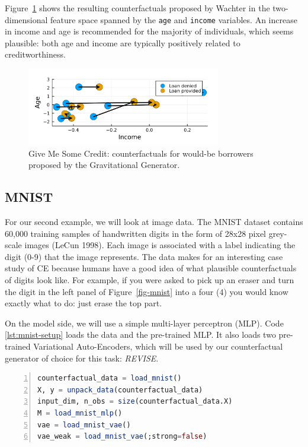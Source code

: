 \documentclass{juliacon}
\begin{document}
Figure~\ref{fig-credit} shows the resulting counterfactuals proposed by
Wachter in the two-dimensional feature space spanned by the \texttt{age}
and \texttt{income} variables. An increase in income and age is
recommended for the majority of individuals, which seems plausible: both
age and income are typically positively related to creditworthiness.

\begin{figure}

{\centering \includegraphics[width=3.33333in,height=1.33333in]{www/credit.png}

}

\caption{\label{fig-credit}Give Me Some Credit: counterfactuals for
would-be borrowers proposed by the Gravitational Generator.}

\end{figure}

\hypertarget{mnist}{%
\subsection{MNIST}\label{mnist}}

For our second example, we will look at image data. The MNIST dataset
contains 60,000 training samples of handwritten digits in the form of
28x28 pixel grey-scale images (LeCun 1998). Each image is associated
with a label indicating the digit (0-9) that the image represents. The
data makes for an interesting case study of CE because humans have a
good idea of what plausible counterfactuals of digits look like. For
example, if you were asked to pick up an eraser and turn the digit in
the left panel of Figure~\ref{fig-mnist} into a four (4) you would know
exactly what to do: just erase the top part.

On the model side, we will use a simple multi-layer perceptron (MLP).
Code \ref{lst:mnist-setup} loads the data and the pre-trained MLP. It
also loads two pre-trained Variational Auto-Encoders, which will be used
by our counterfactual generator of choice for this task: \emph{REVISE}.

\begin{lstlisting}[language=Julia, escapechar=@, numbers=left, label={lst:mnist-setup}, caption={Loading pre-trained models and data for MNIST.}]
counterfactual_data = load_mnist()
X, y = unpack_data(counterfactual_data)
input_dim, n_obs = size(counterfactual_data.X)
M = load_mnist_mlp()
vae = load_mnist_vae()
vae_weak = load_mnist_vae(;strong=false)
\end{lstlisting}
\end{document}
